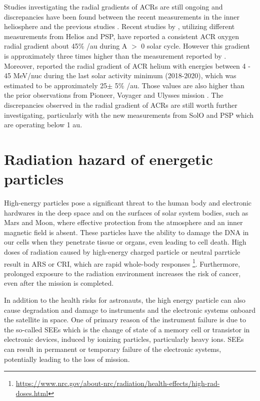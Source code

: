 Studies investigating the radial gradients of \acp{ACR} are still ongoing and discrepancies have been found between the recent measurements in the inner heliosphere and the previous studies \citep{Webber1981JGR, Marsden1999AdSpR}. Recent studies by \citet{Rankin2021ApJ, Rankin2022ApJ, Marquardt2018AA}, utilizing different measurements from Helios and \ac{PSP}, have reported a consistent ACR oxygen radial gradient about 45\% /au during A $>$ 0 solar cycle. However this gradient is approximately three times higher than the measurement reported by \citet{Webber1981JGR}. Moreover, \citet{Rankin2022ApJ} reported the radial gradient of ACR helium with energies between 4 - 45 MeV/nuc during the last solar activity minimum (2018-2020), which was estimated to be approximately 25$\pm$ 5\% /au. Those values are also higher than the prior observations from Pioneer, Voyager and Ulysses mission \citep{McDonald2001ICRC, Webber1981JGR, McKibben1989JGR, McDonald1986GeoRL, Cummings1987GeoRL, Cummings1995GeoRL}. The discrepancies observed in the radial gradient of \acp{ACR} are still worth further investigating, particularly with the new measurements from \ac{SolO} and \ac{PSP} which are operating below 1 au.


\section{Radiation hazard of energetic particles}


High-energy particles pose a significant threat to the human body and electronic hardwares in the deep space and on the surfaces of solar system bodies, such as Mars and Moon, where effective protection from the atmosphere and an inner magnetic field is absent.
These particles have the ability to damage the \ac{DNA} in our cells when they penetrate tissue or organs, even leading to cell death.
High doses of radiation caused by high-energy charged particle or neutral parrticle result in \ac{ARS} or \ac{CRI}, which are rapid whole-body responses \footnote{\url{https://www.nrc.gov/about-nrc/radiation/health-effects/high-rad-doses.html}}. Furthermore, prolonged exposure to the radiation environment increases the risk of cancer, even after the mission is completed.

In addition to the health risks for astronauts, the high energy particle can also cause degradation and damage to instruments and the electronic systems onboard the satellite in space. One of primary reason of the instrument failure is due to the so-called \acp{SEE} which is the change of state of a memory cell or transistor in electronic devices, induced by ionizing particles, particularly heavy ions. \acp{SEE} can result in permanent or temporary failure of the electronic systems, potentially leading to the loss of mission. 


